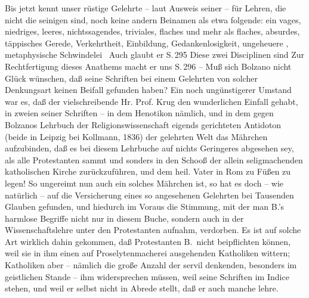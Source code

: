 {Bis jetzt kennt unser rüstige Gelehrte -- laut Ausweis seiner  -- für Lehren, die nicht die seinigen sind, noch keine andern Beinamen als etwa folgende: ein vages, niedriges, leeres, nichtssagendes, triviales, flaches und mehr als flaches, absurdes, täppisches Gerede, Verkehrtheit, Einbildung, Gedankenlosigkeit, ungeheuere , metaphysische Schwindelei \usw\ Auch glaubt er S.\,295  Diese zwei Disciplinen sind  Zur Rechtfertigung dieses Anathems macht er uns S.\,296  -- Muß sich Bolzano nicht Glück wünschen, daß seine Schriften bei einem Gelehrten von solcher Denkungsart keinen Beifall gefunden haben?}
Ein noch ungünstigerer Umstand war es, daß der vielschreibende Hr. Prof. Krug den wunderlichen Einfall gehabt, in zweien seiner Schriften -- in dem Henotikon nämlich, und in dem gegen Bolzanos Lehrbuch der Religionswissenschaft eigends gerichteten Antidoton (beide in  Leipzig bei Kollmann, 1836) der gelehrten Welt das Mährchen aufzubinden, daß es bei diesem Lehrbuche auf nichts Geringeres abgesehen sey, als alle Protestanten sammt und sonders in den Schooß der allein seligmachenden katholischen Kirche zurückzuführen, und dem heil. Vater in Rom zu Füßen zu legen! So ungereimt nun auch ein solches Mährchen ist, so hat es doch -- wie natürlich -- auf die Versicherung eines so angesehenen Gelehrten bei Tausenden Glauben gefunden, und hiedurch im Voraus die Stimmung, mit der man B.'s harmlose Begriffe nicht nur in diesem Buche, sondern auch in der Wissenschaftslehre unter den Protestanten aufnahm, verdorben. Es ist auf solche Art wirklich dahin gekommen, daß Protestanten B.\ nicht beipflichten können, weil sie in ihm einen auf Proselytenmacherei ausgehenden Katholiken wittern; Katholiken aber -- nämlich die große Anzahl der servil denkenden, besonders im geistlichen Stande -- ihm widersprechen müssen, weil seine Schriften im Indice stehen, und weil er selbst nicht in Abrede stellt, daß er auch manche  lehre. \par

